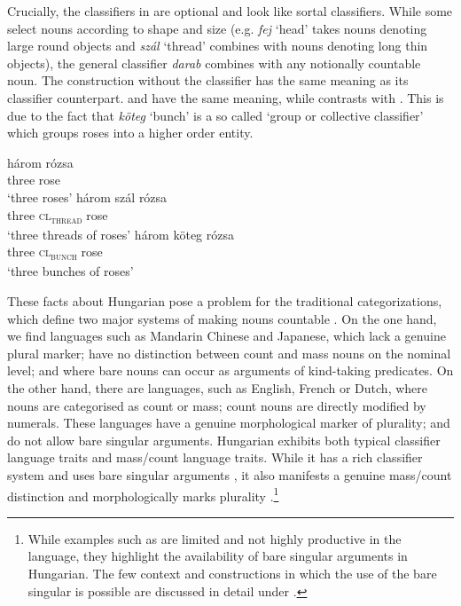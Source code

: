 \documentclass[output=paper]{langscibook}
\begin{document}
\noindent Crucially, the classifiers in  are optional and look like sortal classifiers. While some select nouns according to shape and size (e.g. \textit{fej} `head' takes nouns denoting large round objects and \textit{szál} `thread' combines with nouns denoting long thin objects), the general classifier  \textit{darab} combines with any notionally countable noun. The construction without the classifier has the same meaning as its classifier counterpart.  and  have the same meaning, while  contrasts with . This is due to the fact that \textit{köteg} `bunch' is a so called `group or collective classifier' which groups roses into a higher order entity. 

\ea \label{schv-nem:ex:3}
\ea \label{schv-nem:ex:3a}
\gll három rózsa\\
    three  rose\\
\glt `three roses'
\ex \label{schv-nem:ex:3b}
\gll három szál rózsa\\
    three \textsc{cl\textsubscript{thread}} rose\\
\glt `three threads of roses'
\ex \label{schv-nem:ex:3c}
\gll három köteg rózsa\\
    three \textsc{cl\textsubscript{bunch}} rose\\
\glt `three bunches of roses'
\z
\z

\noindent These facts about Hungarian pose a problem for the traditional categorizations, which define two major systems of making nouns countable \citep{greenberg-74, chierchia-98a}. On the one hand, we find languages such as Mandarin Chinese and Japanese, which lack a genuine plural marker; have no distinction between count and mass nouns on the nominal level; and where bare nouns can occur as arguments of kind-taking predicates. On the other hand, there are languages, such as English, French or Dutch, where nouns are categorised as count or mass; count nouns are directly modified by numerals. These languages have a genuine morphological marker of plurality; and do not allow bare singular arguments. Hungarian exhibits both typical classifier language traits and mass/count language traits. While it has a rich classifier system and uses bare singular arguments , it also manifests a genuine mass/count distinction \citep{schvarcz-14} and morphologically marks plurality .\footnote{While examples such as    are limited and not highly productive in the language, they highlight the availability of bare singular arguments in Hungarian. The few context and constructions in which the use of the bare singular is possible are discussed in detail under .}
\end{document}
